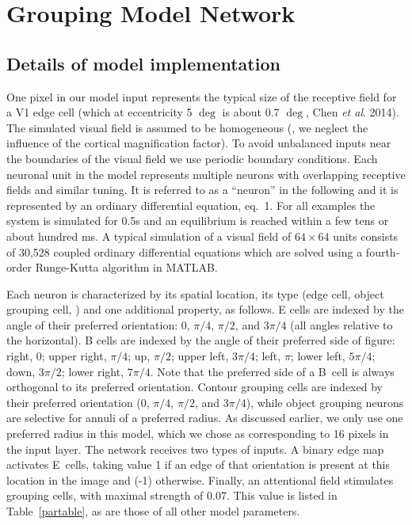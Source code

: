 
\chapter{Grouping Model Network}
\label{sec:appendix}

\section{Details of model implementation}
\label{sec:appendix_eq}

One pixel in our model input represents the typical size of the receptive
field for 
a V1
edge cell (which at eccentricity 5 $\deg$ is about 0.7
$\deg$, Chen {\em et al}. 2014).  The simulated visual field is
assumed to be homogeneous
(\ie, we neglect the influence of the cortical magnification factor).  
To avoid unbalanced inputs near the
boundaries of the visual field we use periodic boundary
conditions. Each neuronal unit in the model represents multiple
neurons with overlapping receptive fields and similar tuning.  It is
referred to as a ``neuron'' in the following and it is represented by
an ordinary differential equation, eq.~1.  For all examples the system
is simulated for 0.5s and an equilibrium is reached within a few tens
or about hundred ms.  A typical simulation of a visual field of
$64\times 64$ units consists of 30,528 coupled ordinary differential
equations which are solved using a fourth-order Runge-Kutta  algorithm
in MATLAB.

Each neuron is characterized by its spatial location, its type (edge
cell, object grouping cell, \etc) and one additional property, as
follows. E cells are indexed by the angle of their preferred
orientation: $0$, $\pi/4$, $\pi/2$, and $3\pi/4$
(all angles relative to the horizontal). 
B cells are indexed
by the angle of their preferred side of figure: right, $0$; upper
right, $\pi/4$; up, $\pi/2$; upper left, $3\pi/4$; left, $\pi$; lower
left, $5\pi/4$; down, $3\pi/2$; lower right, $7\pi/4$. 
Note that the preferred side of a 
B~cell
 is always orthogonal to its preferred orientation. Contour
grouping cells are indexed by their preferred orientation ($0$,
$\pi/4$, $\pi/2$, and $3\pi/4$), while object grouping neurons are
selective for annuli of a preferred radius.
As discussed earlier, we only use one preferred radius in this model,
which we chose as corresponding to 16 pixels in the input layer.
The network receives two types
of inputs. A binary edge map activates E~cells, taking value 1 if an
edge of that orientation is present
at this location in the image and (-1)
otherwise. Finally, an attentional field stimulates grouping cells,
with maximal strength of 0.07. This value is listed in
Table~\ref{partable}, as are those of all other model parameters.

